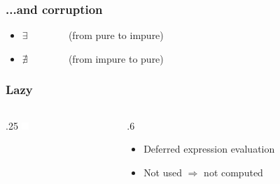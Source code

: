 \documentclass[17pt]{beamer}
\renewcommand{\(}[1]{\begin{columns}[#1]}
\renewcommand{\)}{\end{columns}}
\newcommand{\<}[1]{\begin{column}{#1}}
\renewcommand{\>}{\end{column}}
\begin{document}
\begin{frame}[fragile]
\begin{center}
  \end{center}
  \>
  \)
\end{frame}

\begin{frame}[fragile]
  \frametitle{...and corruption}
  \begin{itemize}
  \item $\exists$ ~~ ~~~~~{\small (from pure to impure)}
  \item $\nexists$ ~~ ~~~~~{\small (from impure to pure)}
  \end{itemize}

  \begin{center}
  \end{center}
\end{frame}

\begin{frame}
  \frametitle{Lazy}
  \({c}
  \<{.25\textwidth}
  \includegraphics[width=\textwidth]{img/replace_me_with_anything_you_want}
  \>
  \<{.6\textwidth}
  \begin{itemize}
  \item Deferred expression evaluation
  \item Not used $\Rightarrow$ not computed
  \end{itemize}
  \>
  \)
  \pause
  ~\\
  \begin{center}
    \Large
  \end{center}
\end{frame}
\end{document}
